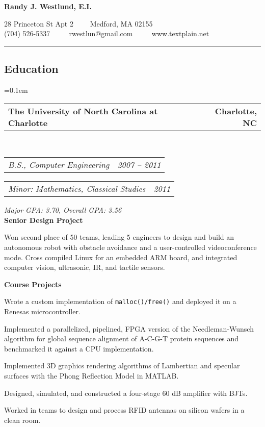 \documentclass[10pt,letterpaper]{article}
\makeatletter
\newcommand{\headerrow}[2]
{\begin{tabular*}{\linewidth}{l@{\extracolsep{\fill}}r}
	#1 & #2 \\
\end{tabular*}}
\makeatother
\begin{document}
\begin{center}
{\LARGE \textbf{Randy J. Westlund, E.I.}}

28 Princeton St Apt 2 \ \ \textbullet \ \ Medford, MA 02155 \\
(704) 526-5337 \ \ \textbullet
\ \ rwestlun@gmail.com \ \ \textbullet
\ \ www.textplain.net
\end{center}

\hrule
\vspace{-0.4em}
\subsection*{Education}
\begin{itemize*}
	\parskip=0.1em
	\item 
	\headerrow
		{\textbf{The University of North Carolina at Charlotte}}
		{\textbf{Charlotte, NC}}
	\\
	\headerrow
		{\emph{B.S., Computer Engineering}}
		{\emph{2007 -- 2011}}
	\headerrow
		{\emph{Minor: Mathematics, Classical Studies}}
		{\emph{2011}}
        \emph{Major GPA: 3.70, Overall GPA: 3.56} \\
        \textbf{Senior Design Project}
        \begin{itemize*}
            \item Won second place of 50 teams, leading 5 engineers to design
                and build an autonomous robot with obstacle avoidance and a
                user-controlled videoconference mode.  Cross compiled Linux for
                an embedded ARM board, and integrated computer vision,
                ultrasonic, IR, and tactile sensors.
        \end{itemize*}
    \textbf{Course Projects}
    \begin{itemize*}
        \item Wrote a custom implementation of \texttt{malloc()/free()} and
            deployed it on a Renesas microcontroller.

        \item Implemented a parallelized, pipelined, FPGA version of the
            Needleman-Wunsch algorithm for global sequence alignment of A-C-G-T
            protein sequences and benchmarked it against a CPU implementation.

        \item Implemented 3D graphics rendering algorithms of Lambertian and
            specular surfaces with the Phong Reflection Model in MATLAB.

        \item Designed, simulated, and constructed a four-stage 60 dB amplifier
            with BJTs.

        \item Worked in teams to design and process RFID antennas on silicon
            wafers in a clean room.
    \end{itemize*}
\end{itemize*}
\end{document}
